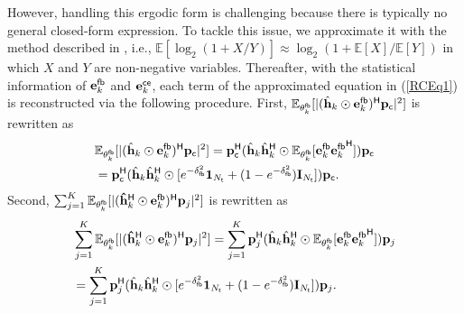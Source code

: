 \documentclass[draftclsnofoot, onecolumn, comsoc, 12pt]{IEEEtran}
\begin{document}
{ However, handling this ergodic form is challenging because there is typically no general closed-form expression.
To tackle this issue, we approximate it with the method described in \cite{6816003}, i.e., $\mathbb{E}[\log_2(1+X/Y)]\approx \log_2(1+\mathbb{E}[X]/\mathbb{E}[Y])$ in which $X$ and $Y$ are non-negative variables.} %
Thereafter, with the statistical information of ${\mathbf{e}_{k}^{\sf{fb}}}$ and ${\mathbf{e}_{k}^{\sf{ce}}}$, each term of the approximated equation in (\ref{RCEq1}) is reconstructed via the following procedure.
First, $\mathbb{E}_{\mathbf{\theta}_k^{\sf{fb}}}[\vert(\hat{\mathbf{h}}_{k} \odot {\mathbf{e}_{k}^{\sf{fb}}})^{\sf{H}} \mathbf{p}_{\sf{c}} \vert^{2}]$ is rewritten as 
\begin{align}
\label{Derv_1} 
& \mathbb{E}_{\mathbf{\theta}_k^{\sf{fb}}}[\vert(\hat{\mathbf{h}}_{k} \odot {\mathbf{e}_{k}^{\sf{fb}}})^{\sf{H}} \mathbf{p}_{\sf{c}} \vert^{2}] 
= \mathbf{p}_{\sf{c}}^{\sf{H}}(\hat{\mathbf{h}}_{k}\hat{\mathbf{h}}_{k}^{\sf{H}}\odot\mathbb{E}_{\mathbf{\theta}_k^{\sf{fb}}}[{\mathbf{e}_{k}^{\sf{fb}}} {\mathbf{e}_{k}^{\sf{fb}}}^{\sf{H}}])\mathbf{p}_{\sf{c}} \nonumber \\ 
& = \mathbf{p}_{\sf{c}}^{\sf{H}}(\hat{\mathbf{h}}_{k}\hat{\mathbf{h}}_{k}^{\sf{H}}\odot[e^{-\delta_{\sf{fb}}^{2}}\mathbf{1}_{N_{{\sf{t}}}} + (1-e^{-\delta_{\sf{fb}}^{2}})\mathbf{I}_{N_{{\sf{t}}}}])\mathbf{p}_{\sf{c}}.
\end{align}
Second, $\sum_{j=1}^{K}\mathbb{E}_{\mathbf{\theta}_k^{\sf{fb}}}[\vert (\mathbf{\hat{h}}_{k}^{\sf{H}}\odot{\mathbf{e}_{k}^{\sf{fb}}})^{\sf{H}} \mathbf{p}_{j} \vert^{2}]$ is rewritten as
\begin{align}
\label{Derv_2} 
&\sum_{j=1}^{K}\mathbb{E}_{\mathbf{\theta}_k^{\sf{fb}}}[\vert (\mathbf{\hat{h}}_{k}^{\sf{H}}\odot{\mathbf{e}_{k}^{\sf{fb}}})^{\sf{H}} \mathbf{p}_{j} \vert^{2}]  
= \sum_{j=1}^{K}\mathbf{p}_{j}^{\sf{H}}(\hat{\mathbf{h}}_{k}\hat{\mathbf{h}}_{k}^{\sf{H}}\odot\mathbb{E}_{\mathbf{\theta}_k^{\sf{fb}}}[{\mathbf{e}_{k}^{\sf{fb}}} {\mathbf{e}_{k}^{\sf{fb}}}^{\sf{H}}])\mathbf{p}_{j}  \nonumber \\
& = \sum_{j=1}^{K} \mathbf{p}_{j}^{\sf{H}}(\hat{\mathbf{h}}_{k}\hat{\mathbf{h}}_{k}^{\sf{H}}\odot[e^{-\delta_{\sf{fb}}^{2}}\mathbf{1}_{N_{{\sf{t}}}} + (1-e^{-\delta_{\sf{fb}}^{2}})\mathbf{I}_{N_{{\sf{t}}}}])\mathbf{p}_{j}.
\end{align}
\end{document}
